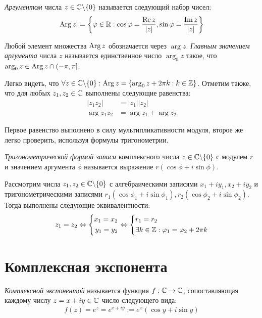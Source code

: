 \begin{definition}
	\textit{Аргументом} числа $z \in \mathbb{C} \backslash \{0\}$ называется следующий набор чисел:
	\[\operatorname{Arg}{z} := \left\{\varphi \in \mathbb{R}: \cos\varphi = \frac{\operatorname{Re} z}{|z|}, \sin\varphi = \frac{\operatorname{Im} z}{|z|}\right\}\]
	
	Любой элемент множества $\operatorname{Arg}{z}$ обозначается через $\arg{z}$. \textit{Главным значением аргумента} числа $z$ называется единственное число $\arg_0{z}$ такое, что $\arg_0{z} \in \operatorname{Arg}{z} \cap (-\pi, \pi]$.
\end{definition}

\begin{note}
	Легко видеть, что $\forall z \in \mathbb{C} \backslash \{0\}: \operatorname{Arg}{z} = \{\arg_0{z} + 2\pi k: k \in \mathbb{Z}\}$. Отметим также, что для любых $z_1, z_2 \in \mathbb{C}$ выполнены следующие равенства:
	\begin{align*}
		|z_1z_2| &= |z_1||z_2|\\
		\arg{z_1z_2} &= \arg{z_1} + \arg{z_2}
	\end{align*}
	
	Первое равенство выполнено в силу мультипликативности модуля, второе же легко проверить, используя формулы тригонометрии.
\end{note}

\begin{definition}
	\textit{Тригонометрической формой записи} комплексного числа $z \in \mathbb{C} \backslash \{0\}$ с модулем $r$ и значением аргумента $\phi$ называется выражение $r(\cos\phi + i\sin\phi)$.
\end{definition}

\begin{note}
	Рассмотрим числа $z_1, z_2 \in \mathbb{C} \backslash \{0\}$ с алгебраическими записями $x_1 + iy_1, x_2 + iy_2$ и тригонометрическими записями $r_1(\cos\phi_1 + i\sin\phi_1), r_2(\cos\phi_2 + i\sin\phi_2)$. Тогда выполнены следующие эквивалентности:
	\[z_1 = z_2 \Leftrightarrow \left\{\begin{aligned}x_1 = x_2 \\ y_1 = y_2\end{aligned}\right. \Leftrightarrow \left\{\begin{aligned}&r_1 = r_2 \\ &\exists k \in \mathbb{Z}: \varphi_1 = \varphi_2 + 2\pi k\end{aligned}\right.\]
\end{note}

\section{Комплексная экспонента}

\begin{definition}
	\textit{Комплексной экспонентой} называется функция $f : \mathbb{C} \to \mathbb{C}$, сопоставляющая каждому числу $z = x + iy \in \mathbb{C}$ число следующего вида:
	\[f(z) = e^z = e^{x + iy} := e^x(\cos{y} + i\sin{y})\]
\end{definition}

